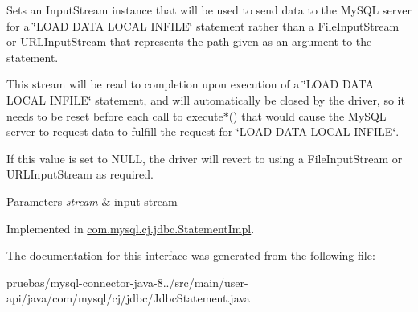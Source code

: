 Sets an Input\+Stream instance that will be used to send data to the My\+S\+QL server for a \char`\"{}\+L\+O\+A\+D D\+A\+T\+A L\+O\+C\+A\+L I\+N\+F\+I\+L\+E\char`\"{} statement rather than a File\+Input\+Stream or U\+R\+L\+Input\+Stream that represents the path given as an argument to the statement.

This stream will be read to completion upon execution of a \char`\"{}\+L\+O\+A\+D D\+A\+T\+A L\+O\+C\+A\+L I\+N\+F\+I\+L\+E\char`\"{} statement, and will automatically be closed by the driver, so it needs to be reset before each call to execute$\ast$() that would cause the My\+S\+QL server to request data to fulfill the request for \char`\"{}\+L\+O\+A\+D D\+A\+T\+A L\+O\+C\+A\+L I\+N\+F\+I\+L\+E\char`\"{}.

If this value is set to N\+U\+LL, the driver will revert to using a File\+Input\+Stream or U\+R\+L\+Input\+Stream as required.


\begin{DoxyParams}{Parameters}
{\em stream} & input stream \\
\hline
\end{DoxyParams}


Implemented in \mbox{\hyperlink{classcom_1_1mysql_1_1cj_1_1jdbc_1_1_statement_impl_a398ed93fc7171fac680cd867a87cbf23}{com.\+mysql.\+cj.\+jdbc.\+Statement\+Impl}}.



The documentation for this interface was generated from the following file\+:\begin{DoxyCompactItemize}
\item 
pruebas/mysql-\/connector-\/java-\/8../src/main/user-\/api/java/com/mysql/cj/jdbc/Jdbc\+Statement.\+java\end{DoxyCompactItemize}
